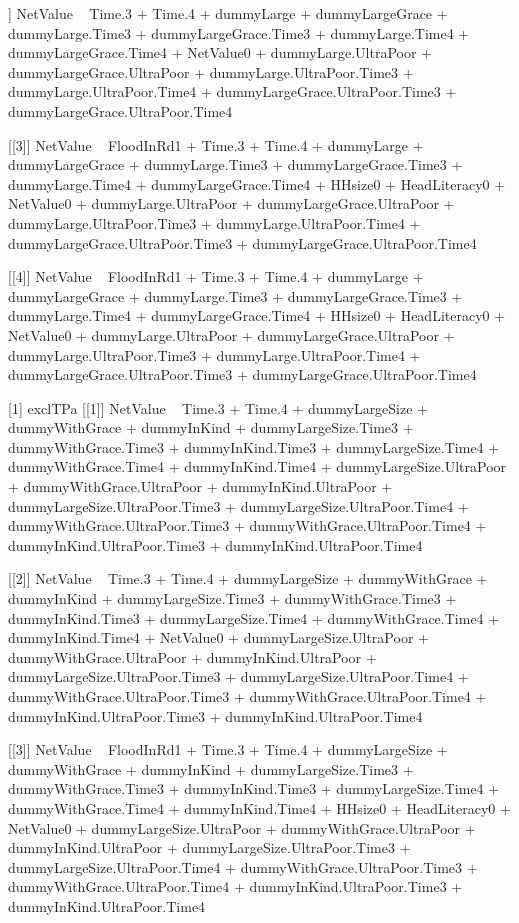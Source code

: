 \begin{Schunk}
\begin{Soutput}
[[2]]
NetValue ~ Time.3 + Time.4 + dummyLarge + dummyLargeGrace + dummyLarge.Time3 + 
    dummyLargeGrace.Time3 + dummyLarge.Time4 + dummyLargeGrace.Time4 + 
    NetValue0 + dummyLarge.UltraPoor + dummyLargeGrace.UltraPoor + 
    dummyLarge.UltraPoor.Time3 + dummyLarge.UltraPoor.Time4 + 
    dummyLargeGrace.UltraPoor.Time3 + dummyLargeGrace.UltraPoor.Time4

[[3]]
NetValue ~ FloodInRd1 + Time.3 + Time.4 + dummyLarge + dummyLargeGrace + 
    dummyLarge.Time3 + dummyLargeGrace.Time3 + dummyLarge.Time4 + 
    dummyLargeGrace.Time4 + HHsize0 + HeadLiteracy0 + NetValue0 + 
    dummyLarge.UltraPoor + dummyLargeGrace.UltraPoor + dummyLarge.UltraPoor.Time3 + 
    dummyLarge.UltraPoor.Time4 + dummyLargeGrace.UltraPoor.Time3 + 
    dummyLargeGrace.UltraPoor.Time4

[[4]]
NetValue ~ FloodInRd1 + Time.3 + Time.4 + dummyLarge + dummyLargeGrace + 
    dummyLarge.Time3 + dummyLargeGrace.Time3 + dummyLarge.Time4 + 
    dummyLargeGrace.Time4 + HHsize0 + HeadLiteracy0 + NetValue0 + 
    dummyLarge.UltraPoor + dummyLargeGrace.UltraPoor + dummyLarge.UltraPoor.Time3 + 
    dummyLarge.UltraPoor.Time4 + dummyLargeGrace.UltraPoor.Time3 + 
    dummyLargeGrace.UltraPoor.Time4

[1] exclTPa
[[1]]
NetValue ~ Time.3 + Time.4 + dummyLargeSize + dummyWithGrace + 
    dummyInKind + dummyLargeSize.Time3 + dummyWithGrace.Time3 + 
    dummyInKind.Time3 + dummyLargeSize.Time4 + dummyWithGrace.Time4 + 
    dummyInKind.Time4 + dummyLargeSize.UltraPoor + dummyWithGrace.UltraPoor + 
    dummyInKind.UltraPoor + dummyLargeSize.UltraPoor.Time3 + 
    dummyLargeSize.UltraPoor.Time4 + dummyWithGrace.UltraPoor.Time3 + 
    dummyWithGrace.UltraPoor.Time4 + dummyInKind.UltraPoor.Time3 + 
    dummyInKind.UltraPoor.Time4

[[2]]
NetValue ~ Time.3 + Time.4 + dummyLargeSize + dummyWithGrace + 
    dummyInKind + dummyLargeSize.Time3 + dummyWithGrace.Time3 + 
    dummyInKind.Time3 + dummyLargeSize.Time4 + dummyWithGrace.Time4 + 
    dummyInKind.Time4 + NetValue0 + dummyLargeSize.UltraPoor + 
    dummyWithGrace.UltraPoor + dummyInKind.UltraPoor + dummyLargeSize.UltraPoor.Time3 + 
    dummyLargeSize.UltraPoor.Time4 + dummyWithGrace.UltraPoor.Time3 + 
    dummyWithGrace.UltraPoor.Time4 + dummyInKind.UltraPoor.Time3 + 
    dummyInKind.UltraPoor.Time4

[[3]]
NetValue ~ FloodInRd1 + Time.3 + Time.4 + dummyLargeSize + dummyWithGrace + 
    dummyInKind + dummyLargeSize.Time3 + dummyWithGrace.Time3 + 
    dummyInKind.Time3 + dummyLargeSize.Time4 + dummyWithGrace.Time4 + 
    dummyInKind.Time4 + HHsize0 + HeadLiteracy0 + NetValue0 + 
    dummyLargeSize.UltraPoor + dummyWithGrace.UltraPoor + dummyInKind.UltraPoor + 
    dummyLargeSize.UltraPoor.Time3 + dummyLargeSize.UltraPoor.Time4 + 
    dummyWithGrace.UltraPoor.Time3 + dummyWithGrace.UltraPoor.Time4 + 
    dummyInKind.UltraPoor.Time3 + dummyInKind.UltraPoor.Time4


\end{Soutput}
\end{Schunk}
